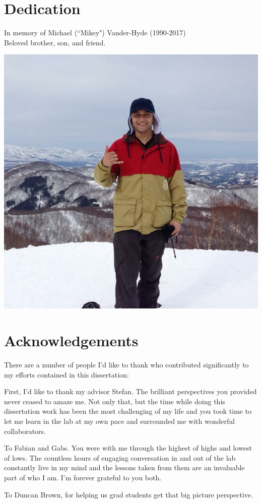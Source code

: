 \documentclass[12pt]{report}
\begin{document}
\chapter*{Dedication}
In memory of Michael (``Mikey") Vander-Hyde (1990-2017)
\\
Beloved brother, son, and friend.

\begin{center}
\includegraphics[width=.75\textwidth]{mikey.jpeg}
\end{center}

\chapter*{Acknowledgements}
There are a number of people I’d like to thank who contributed significantly to my efforts contained in this dissertation:

First, I’d like to thank my advisor Stefan. The brilliant perspectives you provided never ceased to amaze me. Not only that, but the time while doing this dissertation work has been the most challenging of my life and you took time to let me learn in the lab at my own pace and surrounded me with wonderful collaborators. 

To Fabian and Gabs. You were with me through the highest of highs and lowest of lows. The countless hours of engaging conversation in and out of the lab constantly live in my mind and the lessons taken from them are an invaluable part of who I am. I’m forever grateful to you both. 

To Duncan Brown, for helping us grad students get that big picture perspective.
\end{document}
